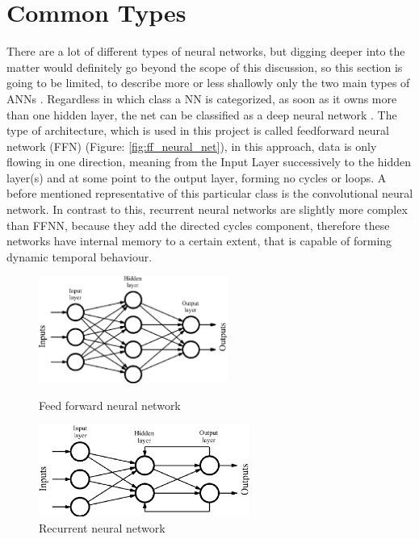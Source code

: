 \section{Common Types}
There are a lot of different types of neural networks, but digging deeper into the matter would definitely go beyond the scope of this discussion, so this section is going to be limited, to describe more or less shallowly only the two main types of ANNs \cite{nntutorial}. Regardless in which class a NN is categorized, as soon as it owns more than one hidden layer, the net can be classified as a deep neural network \cite{deep-learning-methods}. \newline
The type of architecture, which is used in this project is called feedforward neural network (FFN) (Figure: \ref{fig:ff_neural_net}), in this approach, data is only flowing in one direction, meaning from the Input Layer successively to the hidden layer(s) and at some point to the output layer, forming no cycles or loops. A before mentioned representative of this particular class is the convolutional neural network.\newline
In contrast to this, recurrent neural networks are slightly more complex than FFNN, because they add the directed cycles component, therefore these networks have internal memory to a certain extent, that is capable of forming dynamic temporal behaviour. 


\begin{figure}[H]
	
	\includegraphics[height=3.5cm]{images/feed_forward_neural_net.png}
	\caption{Feed forward neural network\protect\footnotemark}
	\label{fig:ff_neural_net}
	\endminipage
	\hfill
	\includegraphics[height=3cm]{images/recurrent_neural_net.png}
	\caption{Recurrent neural network\protect\footnotemark }
	\label{fig:rec_neural_net}
	\endminipage
	
\end{figure}
\setcounter{footnote}{3}
\setcounter{footnote}{4}
